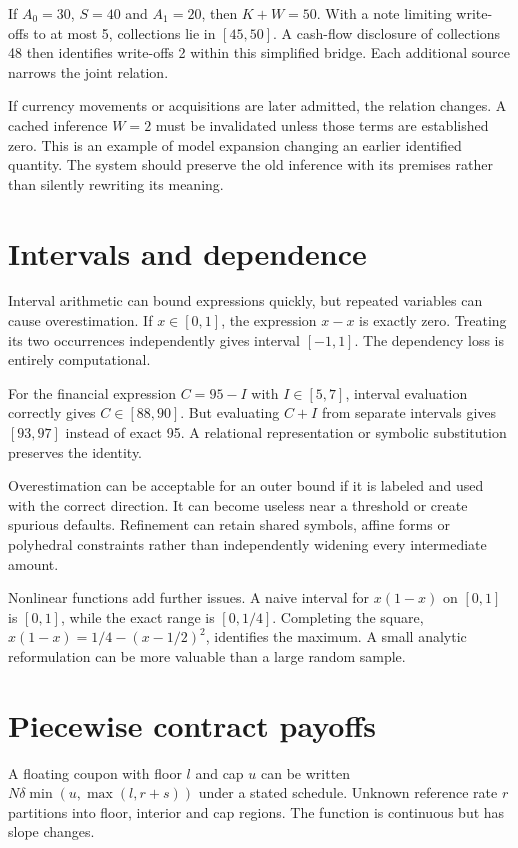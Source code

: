If $A_0=30$, $S=40$ and $A_1=20$, then $K+W=50$. With a note limiting write-offs to at most 5, collections lie in $[45,50]$. A cash-flow disclosure of collections 48 then identifies write-offs 2 within this simplified bridge. Each additional source narrows the joint relation.

If currency movements or acquisitions are later admitted, the relation changes. A cached inference $W=2$ must be invalidated unless those terms are established zero. This is an example of model expansion changing an earlier identified quantity. The system should preserve the old inference with its premises rather than silently rewriting its meaning.

\section{Intervals and dependence}
Interval arithmetic can bound expressions quickly, but repeated variables can cause overestimation. If $x\in[0,1]$, the expression $x-x$ is exactly zero. Treating its two occurrences independently gives interval $[-1,1]$. The dependency loss is entirely computational.

For the financial expression $C=95-I$ with $I\in[5,7]$, interval evaluation correctly gives $C\in[88,90]$. But evaluating $C+I$ from separate intervals gives $[93,97]$ instead of exact 95. A relational representation or symbolic substitution preserves the identity.

Overestimation can be acceptable for an outer bound if it is labeled and used with the correct direction. It can become useless near a threshold or create spurious defaults. Refinement can retain shared symbols, affine forms or polyhedral constraints rather than independently widening every intermediate amount.

Nonlinear functions add further issues. A naive interval for $x(1-x)$ on $[0,1]$ is $[0,1]$, while the exact range is $[0,1/4]$. Completing the square, $x(1-x)=1/4-(x-1/2)^2$, identifies the maximum. A small analytic reformulation can be more valuable than a large random sample.

\section{Piecewise contract payoffs}
A floating coupon with floor $l$ and cap $u$ can be written $N\delta\min(u,\max(l,r+s))$ under a stated schedule. Unknown reference rate $r$ partitions into floor, interior and cap regions. The function is continuous but has slope changes.

